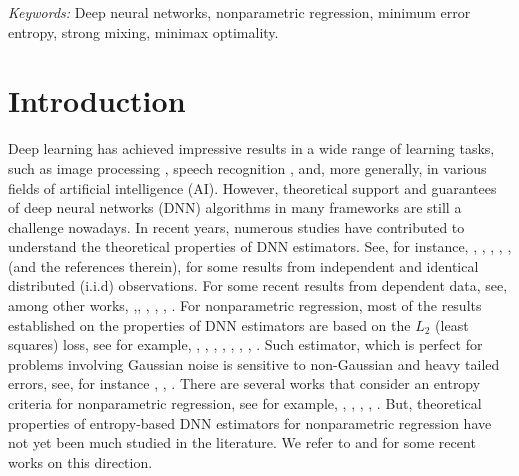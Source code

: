 \documentclass[10pt,twoside]{article}
\numberwithin{equation}{section}
\begin{document}
{\em Keywords:} Deep neural networks, nonparametric regression, minimum error entropy, strong mixing, minimax optimality. 


\medskip
 

 
\section{Introduction}
%
Deep learning has achieved impressive results in a wide range of learning tasks, such as image processing \cite{krizhevsky2017imagenet}, speech recognition \cite{hinton2012deep}, and, more generally, in various fields of artificial intelligence (AI).
%
However, theoretical support and guarantees of deep neural networks (DNN) algorithms in many frameworks are still a challenge nowadays.
% 
In recent years, numerous studies have contributed to understand the theoretical properties of DNN estimators.
%
See, for instance, \cite{schmidt2020nonparametric}, \cite{imaizumi2022advantage} \cite{jiao2023deep}, \cite{fan2024noise}, \cite{zhang2024classification}, \cite{shen2024nonparametric},  (and the references therein), for some results from independent and identical distributed (i.i.d) observations.
%
For some recent results from dependent data, see, among other works, \cite{ma2022theoretical},\cite{kohler2023rate}, \cite{kengne2025robust}, \cite{kurisu2025adaptive}, \cite{kengne2025deep}, \cite{alquier2025minimax}.
%
For nonparametric regression, most of the results established on the properties of DNN estimators are based on the $L_2$ (least squares) loss, see for example, \cite{schmidt2020nonparametric}, \cite{kohler2021rate}, \cite{ma2022theoretical}, \cite{imaizumi2022advantage}, \cite{jiao2023deep}, \cite{kohler2023rate}, \cite{kohler2023rate}, \cite{kurisu2025adaptive}.  
%
Such estimator, which is perfect for problems
involving Gaussian noise is sensitive to non-Gaussian and heavy tailed errors, see, for instance \cite{erdogmus2000comparison}, \cite{hu2013learning}, \cite{chen2018kernel}. 
%
There are several works that consider an entropy criteria for nonparametric regression, see for example, \cite{hu2015regularization}, \cite{hu2013learning}, \cite{fan2016consistency}, \cite{guo2020distributed}, \cite{hu2021kernel}.  
%
But, theoretical properties of entropy-based DNN estimators for nonparametric regression have not yet been much studied in the literature.
We refer to \cite{wang2025deep} and \cite{chen2026maximum} for some recent works on this direction.
%

\medskip
\end{document}

